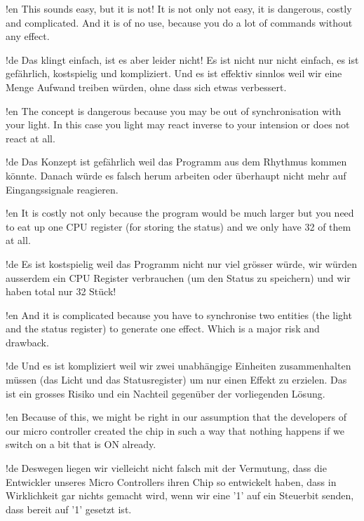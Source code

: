 !en This sounds easy, but it is not! It is not only not easy, it is dangerous, costly and complicated. And it is of no use, because you do a lot of commands without any effect.

!de Das klingt einfach, ist es aber leider nicht! Es ist nicht nur nicht einfach, es ist gefährlich, kostspielig und kompliziert. Und es ist effektiv sinnlos weil wir eine Menge Aufwand treiben würden, ohne dass sich etwas verbessert.



!en The concept is dangerous because you may be out of synchronisation with your light. In this case you light may react inverse to your intension or does not react at all.

!de Das Konzept ist gefährlich weil das Programm aus dem Rhythmus kommen könnte. Danach würde es falsch herum arbeiten oder überhaupt nicht mehr auf Eingangssignale reagieren.



!en It is costly not only because the program would be much larger but you need to eat up one CPU register (for storing the status) and we only have 32 of them at all.

!de Es ist kostspielig weil das Programm nicht nur viel grösser würde, wir würden ausserdem ein CPU Register verbrauchen (um den Status zu speichern) und wir haben total nur 32 Stück!



!en And it is complicated because you have to synchronise two entities (the light and the status register) to generate one effect. Which is a major risk and drawback.

!de Und es ist kompliziert weil wir zwei unabhängige Einheiten zusammenhalten müssen (das Licht und das Statusregister) um nur einen Effekt zu erzielen. Das ist ein grosses Risiko und ein Nachteil gegenüber der vorliegenden Lösung.



!en Because of this, we might be right in our assumption that the developers of our \at micro controller created the chip in such a way that nothing happens if we switch on a bit that is ON already.

!de Deswegen liegen wir vielleicht nicht falsch mit der Vermutung, dass die Entwickler unseres \at Micro Controllers ihren Chip so entwickelt haben, dass in Wirklichkeit gar nichts gemacht wird, wenn wir eine '1' auf ein Steuerbit senden, dass bereit auf '1' gesetzt ist.



